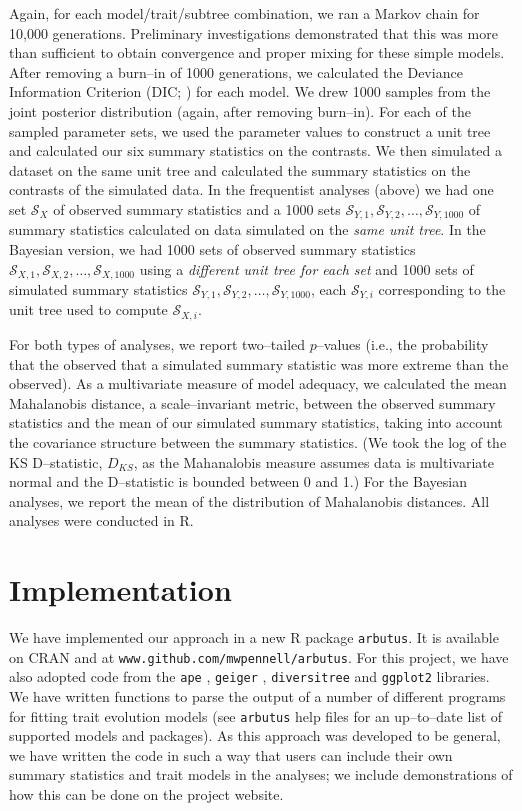\documentclass[a4paper,12pt]{article}
\begin{document}
Again, for each model/trait/subtree combination, we ran a Markov chain for 10,000 generations. Preliminary investigations demonstrated that this was more than sufficient to obtain convergence and proper mixing for these simple models. After removing a burn--in of 1000 generations, we calculated the Deviance Information Criterion (DIC; \citep{dic}) for each model. We drew 1000 samples from the joint posterior distribution (again, after removing burn--in). For each of the sampled parameter sets, we used the parameter values to construct a unit tree and calculated our six summary statistics on the contrasts. We then simulated a dataset on the same unit tree and calculated the summary statistics on the contrasts of the simulated data. In the frequentist analyses (above) we had one set $\mathcal{S}_X$ of observed summary statistics and a 1000 sets $\mathcal{S}_{Y,1}, \mathcal{S}_{Y,2}, \ldots, \mathcal{S}_{Y,1000}$ of summary statistics calculated on data simulated on the \emph{same unit tree}. In the Bayesian version, we had 1000 sets of observed summary statistics $\mathcal{S}_{X,1}, \mathcal{S}_{X,2}, \ldots, \mathcal{S}_{X,1000}$ using a \emph{different unit tree for each set} and 1000 sets of simulated summary statistics $\mathcal{S}_{Y,1}, \mathcal{S}_{Y,2}, \ldots, \mathcal{S}_{Y,1000}$, each $\mathcal{S}_{Y,i}$ corresponding to the unit tree used to compute $\mathcal{S}_{X,i}$.
 
For both types of analyses, we report two--tailed $p$--values (i.e., the probability that the observed that a simulated summary statistic was more extreme than the observed). As a multivariate measure of model adequacy, we calculated the mean Mahalanobis distance, a scale--invariant metric, between the observed summary statistics and the mean of our simulated summary statistics, taking into account the covariance structure between the summary statistics. (We took the log of the KS D--statistic, $D_{KS}$, as the Mahanalobis measure assumes data is multivariate normal and the D--statistic is bounded between 0 and 1.) For the Bayesian analyses, we report the mean of the distribution of Mahalanobis distances. All analyses were conducted in R.

\section{Implementation}

We have implemented our approach in a new R package \texttt{arbutus}. It is available on CRAN and at \texttt{www.github.com/mwpennell/arbutus}. For this project, we have also adopted code from the \texttt{ape} \citep{ape}, \texttt{geiger} \citep{geiger2}, \texttt{diversitree} \citep{FitzJohn2012} and \texttt{ggplot2} \citep{ggplot2} libraries. We have written functions to parse the output of a number of different programs for fitting trait evolution models (see \texttt{arbutus} help files for an up--to--date list of supported models and packages). As this approach was developed to be general, we have written the code in such a way that users can include their own summary statistics and trait models in the analyses; we include demonstrations of how this can be done on the project website.
\end{document}

